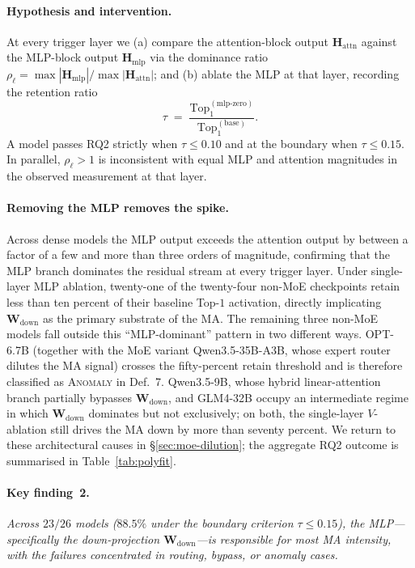 \documentclass{article}
\newcommand{\Wdown}{\mathbf{W}_{\text{down}}}
\newcommand{\topk}{\mathrm{Top}}
\begin{document}
\paragraph{Hypothesis and intervention.}
At every trigger layer we (a) compare the attention-block output
$\mathbf{H}_{\text{attn}}$ against the MLP-block output
$\mathbf{H}_{\text{mlp}}$ via the dominance ratio
$\rho_\ell = \max|\mathbf{H}_{\text{mlp}}| / \max|\mathbf{H}_{\text{attn}}|$;
and (b) ablate the MLP at that layer, recording the retention ratio
\begin{equation}
  \label{eq:tau-retain}
  \tau \;=\; \frac{\topk_1^{(\text{mlp-zero})}}{\topk_1^{(\text{base})}}.
\end{equation}
A model passes RQ2 strictly when $\tau \leq 0.10$ and at the boundary when
$\tau \leq 0.15$. In parallel, $\rho_\ell > 1$ is inconsistent with equal
MLP and attention magnitudes in the observed measurement at that layer.

\paragraph{Removing the MLP removes the spike.}
Across dense models the MLP output exceeds the attention output by
between a factor of a few and more than three orders of magnitude,
confirming that the MLP branch dominates the residual stream at every
trigger layer. Under single-layer MLP ablation, twenty-one of the
twenty-four non-MoE checkpoints retain less than ten percent of their
baseline Top-$1$ activation, directly implicating $\Wdown$ as the
primary substrate of the MA. The remaining three non-MoE models fall
outside this ``MLP-dominant'' pattern in two different ways. OPT-6.7B
(together with the MoE variant Qwen3.5-35B-A3B, whose expert router
dilutes the MA signal) crosses the fifty-percent retain threshold and
is therefore classified as \textsc{Anomaly} in Def.~7. Qwen3.5-9B,
whose hybrid linear-attention branch partially bypasses $\Wdown$, and
GLM4-32B occupy an intermediate regime in which $\Wdown$ dominates but
not exclusively; on both, the single-layer $V$-ablation still drives
the MA down by more than seventy percent. We return to these
architectural causes in \S\ref{sec:moe-dilution}; the aggregate RQ2
outcome is summarised in Table~\ref{tab:polyfit}.

\paragraph{Key finding~2.}
\emph{Across $23/26$ models ($88.5\%$ under the boundary criterion
$\tau \leq 0.15$), the MLP---specifically the down-projection
$\Wdown$---is responsible for most MA intensity, with the failures
concentrated in routing, bypass, or anomaly cases.}
\end{document}
